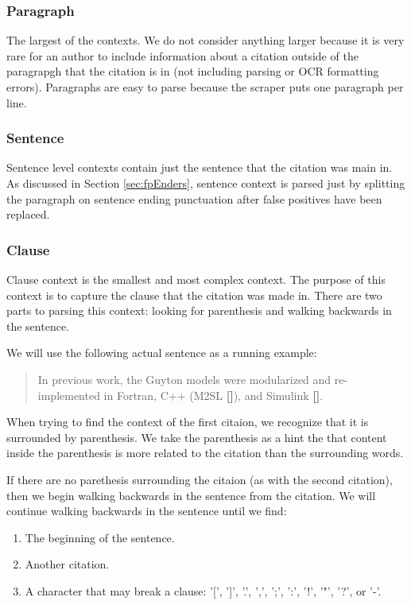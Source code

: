 \documentclass[10pt, conference, compsocconf]{IEEEtran}
\begin{document}
\subsubsection{Paragraph}
The largest of the contexts. We do not consider anything larger because it is very rare for an author to include information about a citation
outside of the paragrapgh that the citation is in (not including parsing or OCR formatting errors). Paragraphs are easy to parse because the
scraper puts one paragraph per line.

\subsubsection{Sentence}
Sentence level contexts contain just the sentence that the citation was main in. As discussed in Section \ref{sec:fpEnders},
sentence context is parsed just by splitting the paragraph on sentence ending punctuation after false positives have been replaced.

\subsubsection{Clause}
Clause context is the smallest and most complex context. The purpose of this context is to capture the clause that the citation was made in.
There are two parts to parsing this context: looking for parenthesis and walking backwards in the sentence.

We will use the following actual sentence as a running example:
\begin{quote}
In previous work, the Guyton models were modularized and re-implemented in Fortran, C++ (M2SL \textbf{[]}), and Simulink \textbf{[]}.
\end{quote}

When trying to find the context of the first citaion, we recognize that it is surrounded by parenthesis.
We take the parenthesis as a hint the that content inside the parenthesis is more related to the citation than the surrounding words.

If there are no parethesis surrounding the citaion (as with the second citation), then we begin walking backwards in the sentence from the citation.
We will continue walking backwards in the sentence until we find:
\begin{enumerate}
   \item The beginning of the sentence.
   \item Another citation.
   \item A character that may break a clause: '[', ']', '.', ',', ';', ':', '!', '"', '?', or '-'.
\end{enumerate}
\end{document}

